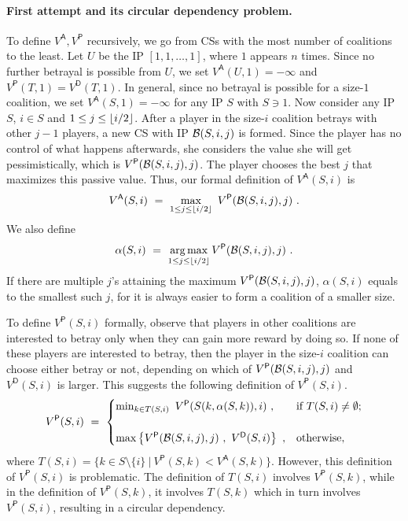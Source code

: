 \documentclass[11pt]{article}
\newcommand{\va}{V^{\textsf{A}}}
\newcommand{\vp}{V^{\textsf{P}}}
\newcommand{\vd}{V^{\textsf{D}}}
\newcommand{\multiset}[1]{[#1]}
\begin{document}
{\paragraph{First attempt and its circular dependency problem.}
To define $\va,\vp$ recursively, we go from CSs with the most number of coalitions to the least.
Let $U$ be the IP $\multiset{1,1,\ldots,1}$, where $1$ appears $n$ times.
Since no further betrayal is possible from $U$, we set $\va(U,1) = -\infty$ and $\vp(T,1) = \vd(T,1)$.
In general, since no betrayal is possible for a size-$1$ coalition, we set $\va(S,1) = -\infty$ for any IP $S$ with $S\ni 1$.
Now consider any IP $S$, $i\in S$ and $1\le j\le \left\lfloor i/2 \right\rfloor$. After a player in the size-$i$ coalition betrays with other $j-1$ players,
a new CS with IP $\mathcal{B}(S,i,j)$ is formed. Since the player has no control of what happens afterwards, she considers the value she will get pessimistically,
which is $\vp(\calB(S,i,j),j)$. The player chooses the best $j$ that maximizes this passive value. Thus, our formal definition of $\va(S,i)$ is
\begin{equation}\label{eq:activeValue}
\va(S,i) ~=~ \max_{1\le j\le \floor{i/2}}~\vp(\calB(S,i,j),j)~.
\end{equation}
We also define
\[
\alpha(S,i) ~=~ \argmax_{1\le j\le \floor{i/2}} \vp(\calB(S,i,j),j)~.
\]
If there are multiple $j$'s attaining the maximum $\vp(\calB(S,i,j),j)$, $\alpha(S,i)$ equals to the smallest such $j$,
for it is always easier to form a coalition of a smaller size.

To define $\vp(S,i)$ formally, observe that players in other coalitions are interested to betray only when they can gain more reward by doing so.
If none of these players are interested to betray, then the player in the size-$i$ coalition can choose either betray or not, depending on which of
$\vp(\calB(S,i,j),j)$ and $\vd(S,i)$ is larger. This suggests the following definition of $\vp(S,i)$.
\[
\vp(S,i) ~=~ 
\begin{cases}
\min_{k\in T(S,i)}~\vp(S(k,\alpha(S,k)),i)~,&\text{if }T(S,i)\neq \emptyset;\\
~&~\\
\max \left\{ \vp(\calB(S,i,j),j)~,~\vd(S,i) \right\}~,&\text{otherwise},
\end{cases}
\]
where $T(S,i)=\{k\in S\setminus\{i\}~|~\vp(S,k) < \va(S,k)\}$. However, this definition of $\vp(S,i)$ is problematic.
The definition of $T(S,i)$ involves $\vp(S,k)$,
while in the definition of $\vp(S,k)$, it involves $T(S,k)$ which in turn involves $\vp(S,i)$, resulting in a circular dependency.

}
\end{document}

